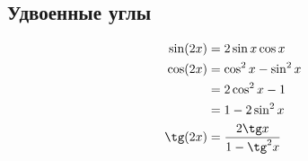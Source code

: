 \subsection*{Удвоенные углы}

\begin{align*}
  \sin(2x)  &= 2 \sin x \cos x\\
  \cos(2x)  &= \cos^2 x - \sin^2 x\\
            &= 2 \cos^2 x - 1\\
            &= 1 - 2 \sin^2 x\\
  \tg(2x)  &= \frac{2 \tg x}{1 - \tg^2 x}
\end{align*}